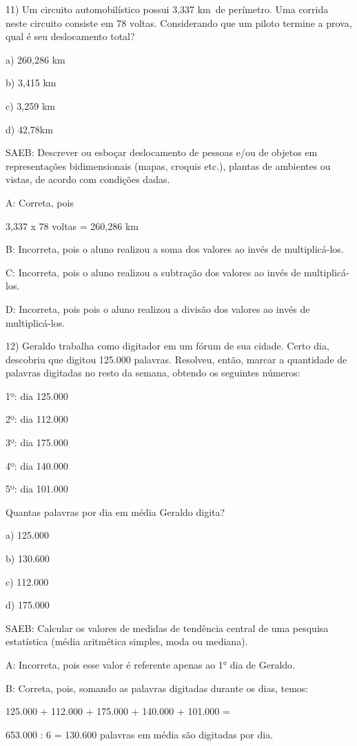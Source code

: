 11) Um circuito automobilístico possui 3,337 km~de perímetro. Uma
corrida neste circuito consiste em 78 voltas. Considerando que um piloto
termine a prova, qual é seu deslocamento total?

a) 260,286 km

b) 3,415 km

c) 3,259 km

d) 42,78km

SAEB: Descrever ou esboçar deslocamento de pessoas e/ou de objetos em
representações bidimensionais (mapas, croquis etc.), plantas de
ambientes ou vistas, de acordo com condições dadas.

A: Correta, pois

3,337 x 78 voltas = 260,286 km

B: Incorreta, pois o aluno realizou a soma dos valores ao invés de
multiplicá-los.

C: Incorreta, pois o aluno realizou a subtração dos valores ao invés de
multiplicá-los.

D: Incorreta, pois pois o aluno realizou a divisão dos valores ao invés
de multiplicá-los.

12) Geraldo trabalha como digitador em um fórum de sua cidade. Certo
dia, descobriu que digitou 125.000 palavras. Resolveu, então, marcar a
quantidade de palavras digitadas no resto da semana, obtendo os
seguintes números:

1º: dia 125.000

2º: dia 112.000

3º: dia 175.000

4º: dia 140.000

5º: dia 101.000

Quantas palavras por dia em média Geraldo digita?

a) 125.000

b) 130.600

c) 112.000

d) 175.000

SAEB: Calcular os valores de medidas de tendência central de uma
pesquisa estatística (média aritmética simples, moda ou mediana).

A: Incorreta, pois esse valor é referente apenas ao 1° dia de Geraldo.

B: Correta, pois, somando as palavras digitadas durante os dias, temos:

125.000 + 112.000 + 175.000 + 140.000 + 101.000 =

653.000 : 6 = 130.600 palavras em média são digitadas por dia.

